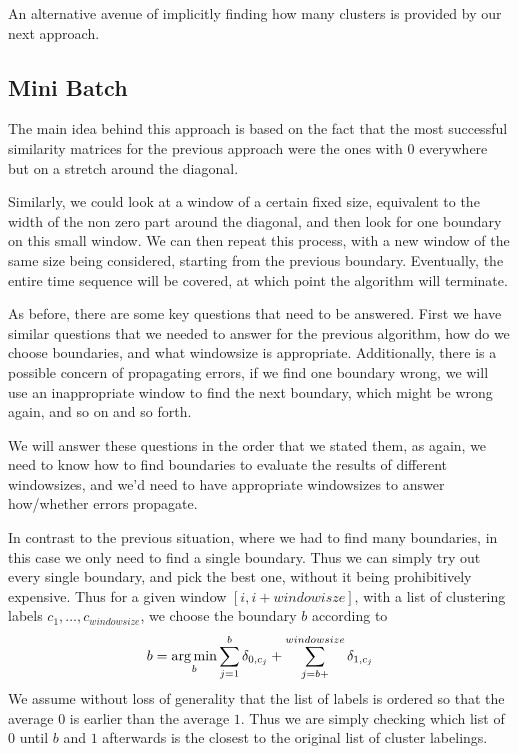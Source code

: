 An alternative avenue of implicitly finding how many clusters is provided by our next approach.

\subsection{Mini Batch}
The main idea behind this approach is based on the fact that the most successful similarity matrices for the previous approach were the ones with $0$ everywhere but on a stretch around the diagonal. 

Similarly, we could look at a window of a certain fixed size, equivalent to the width of the non zero part around the diagonal, and then look for one boundary on this small window. We can then repeat this process, with a new window of the same size being considered, starting from the previous boundary. Eventually, the entire time sequence will be covered, at which point the algorithm will terminate.

As before, there are some key questions that need to be answered. First we have similar questions that we needed to answer for the previous algorithm, how do we choose boundaries, and what windowsize is appropriate. Additionally, there is a possible concern of propagating errors, if we find one boundary wrong, we will use an inappropriate window to find the next boundary, which might be wrong again, and so on and so forth.

We will answer these questions in the order that we stated them, as again, we need to know how to find boundaries to evaluate the results of different windowsizes, and we'd need to have appropriate windowsizes to answer how/whether errors propagate.

In contrast to the previous situation, where we had to find many boundaries, in this case we only need to find a single boundary. Thus we can simply try out every single boundary, and pick the best one, without it being prohibitively expensive. Thus for a given window $[i,i+windowisze]$, with a list of clustering labels $c_1,\ldots,c_{windowsize}$, we choose the boundary $b$ according to
\[
b=\operatorname*{arg\,min}_{b} \sum\limits_{j=1}^{b} \delta_{0,c_j} +\sum\limits_{j=b+}^{windowsize} \delta_{1,c_j}
\]
We assume without loss of generality that the list of labels is ordered so that the average $0$ is earlier than the average $1$. Thus we are simply checking which list of $0$ until $b$ and $1$ afterwards is the closest to the original list of cluster labelings.

